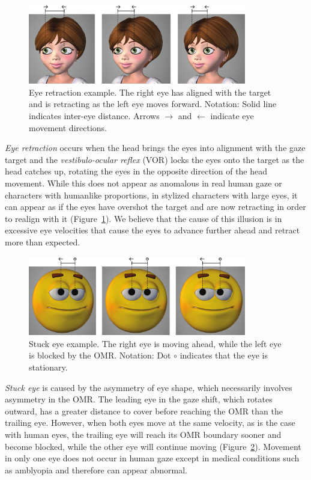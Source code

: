 \begin{figure}
\centering
\includegraphics[width=0.85\textwidth]{stylizedgaze/Figures/EyeRetractionExample-small.pdf}
\caption{Eye retraction example. The right eye has aligned with the target and is retracting as the left eye moves forward. Notation: Solid line indicates inter-eye distance. Arrows $\rightarrow$ and $\leftarrow$ indicate eye movement directions.}
\label{fig:EyeRetractionExample}
\end{figure}

\noindent\emph{Eye retraction} occurs when the head brings the eyes into alignment with the gaze target and the \textit{vestibulo-ocular reflex} (VOR) locks the eyes onto the target as the head catches up, rotating the eyes in the opposite direction of the head movement. While this does not appear as anomalous in real human gaze or characters with humanlike proportions, in stylized characters with large eyes, it can appear as if the eyes have overshot the target and are now retracting in order to realign with it (Figure~\ref{fig:EyeRetractionExample}). We believe that the cause of this illusion is in excessive eye velocities that cause the eyes to advance further ahead and retract more than expected.

\begin{figure}
\centering
\includegraphics[width=0.85\textwidth]{stylizedgaze/Figures/StuckEyeExample-small.pdf}
\caption{Stuck eye example. The right eye is moving ahead, while the left eye is blocked by the OMR. Notation: Dot $\circ$ indicates that the eye is stationary.}
\label{fig:StuckEyeExample}
\end{figure}

\emph{Stuck eye} is caused by the asymmetry of eye shape, which necessarily involves asymmetry in the OMR. The leading eye in the gaze shift, which rotates outward, has a greater distance to cover before reaching the OMR than the trailing eye. However, when both eyes move at the same velocity, as is the case with human eyes, the trailing eye will reach its OMR boundary sooner and become blocked, while the other eye will continue moving (Figure~\ref{fig:StuckEyeExample}). Movement in only one eye does not occur in human gaze except in medical conditions such as amblyopia and therefore can appear abnormal.

